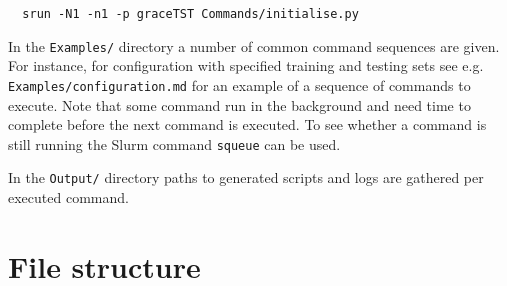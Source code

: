 \documentclass{article}
\begin{document}
\begin{verbatim}
  srun -N1 -n1 -p graceTST Commands/initialise.py
\end{verbatim}

In the \texttt{Examples/} directory a number of common command sequences are given. For instance, for configuration with specified training and testing sets see e.g. \texttt{Examples/configuration.md} for an example of a sequence of commands to execute. Note that some command run in the background and need time to complete before the next command is executed. To see whether a command is still running the Slurm command \texttt{squeue} can be used.

In the \texttt{Output/} directory paths to generated scripts and logs are gathered per executed command.

\section{File structure}

%
%
%
\end{document}
